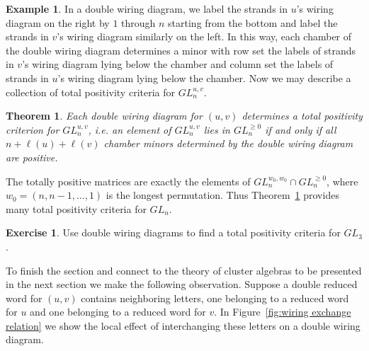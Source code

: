 \documentclass{amsart}
\newtheorem{subtheorem}{Theorem}[theorem]
\theoremstyle{definition}
\newtheorem{example}[theorem]{Example}
\newtheorem{subexercise}{Exercise}[theorem]
\theoremstyle{remark}
\numberwithin{equation}{section}
\begin{document}
\begin{example}
    In a double wiring diagram, we label the strands in $u$'s wiring diagram on the right by $1$ through $n$ starting from the bottom and label the strands in $v$'s wiring diagram similarly on the left.  In this way, each chamber of the double wiring diagram determines a minor with row set the labels of strands in $v$'s wiring diagram lying below the chamber and column set the labels of strands in $u$'s wiring diagram lying below the chamber.  Now we may describe a collection of total positivity criteria for $GL_n^{u,v}$.
    \setcounter{subtheorem}{2}
    \begin{subtheorem}\label{th:total positivity criteria}\cite{FZ99}
      Each double wiring diagram for $(u,v)$ determines a total positivity criterion for $GL_n^{u,v}$, i.e. an element of $GL_n^{u,v}$ lies in $GL_n^{\ge0}$ if and only if all $n+\ell(u)+\ell(v)$ chamber minors determined by the double wiring diagram are positive.
    \end{subtheorem}
    The totally positive matrices are exactly the elements of $GL_n^{w_0,w_0}\cap GL_n^{\ge0}$, where $w_0=(n,n-1,\ldots,1)$ is the longest permutation.  Thus Theorem~\ref{th:total positivity criteria} provides many total positivity criteria for $GL_n$.
    \setcounter{subexercise}{3}
    \begin{subexercise}
      Use double wiring diagrams to find a total positivity criteria for $GL_3$.
    \end{subexercise}
    To finish the section and connect to the theory of cluster algebras to be presented in the next section we make the following observation.  Suppose a double reduced word for $(u,v)$ contains neighboring letters, one belonging to a reduced word for $u$ and one belonging to a reduced word for $v$.  In Figure~\ref{fig:wiring exchange relation} we show the local effect of interchanging these letters on a double wiring diagram. 
    \begin{figure}[h]
\end{figure}
\end{example}
\end{document}
